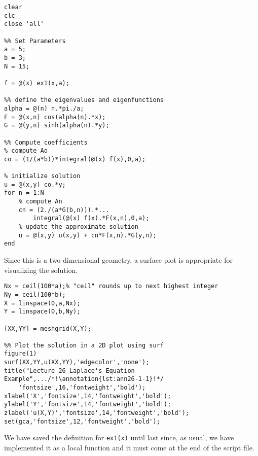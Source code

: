 \begin{lstlisting}[name=lec26-ex1, style=myMatlab]
clear
clc
close 'all'

%% Set Parameters
a = 5;
b = 3;
N = 15;

f = @(x) ex1(x,a);

%% define the eigenvalues and eigenfunctions
alpha = @(n) n.*pi./a;
F = @(x,n) cos(alpha(n).*x);
G = @(y,n) sinh(alpha(n).*y);

%% Compute coefficients
% compute Ao
co = (1/(a*b))*integral(@(x) f(x),0,a);

% initialize solution
u = @(x,y) co.*y;
for n = 1:N
    % compute An
    cn = (2./(a*G(b,n))).*...
        integral(@(x) f(x).*F(x,n),0,a);
    % update the approximate solution
    u = @(x,y) u(x,y) + cn*F(x,n).*G(y,n);
end
\end{lstlisting}

\vspace{0.2cm}

\noindent Since this is a two-dimensional geometry, a surface plot is appropriate for visualizing the solution.

\begin{lstlisting}[name=lec26-ex1, style=myMatlab]
%% Make discrete spatial coordinate axes
Nx = ceil(100*a);% "ceil" rounds up to next highest integer
Ny = ceil(100*b);
X = linspace(0,a,Nx);
Y = linspace(0,b,Ny);

[XX,YY] = meshgrid(X,Y);

%% Plot the solution in a 2D plot using surf
figure(1)
surf(XX,YY,u(XX,YY),'edgecolor','none');
title("Lecture 26 Laplace's Equation Example",.../*!\annotation{lst:ann26-1-1}!*/
    'fontsize',16,'fontweight','bold');
xlabel('X','fontsize',14,'fontweight','bold');
ylabel('Y','fontsize',14,'fontweight','bold');
zlabel('u(X,Y)','fontsize',14,'fontweight','bold');
set(gca,'fontsize',12,'fontweight','bold');
\end{lstlisting}
We have saved the definition for \lstinline[style=myMatlab]{ex1(x)} until last since, as usual, we have implemented it as a local function and it must come at the end of the script file.

